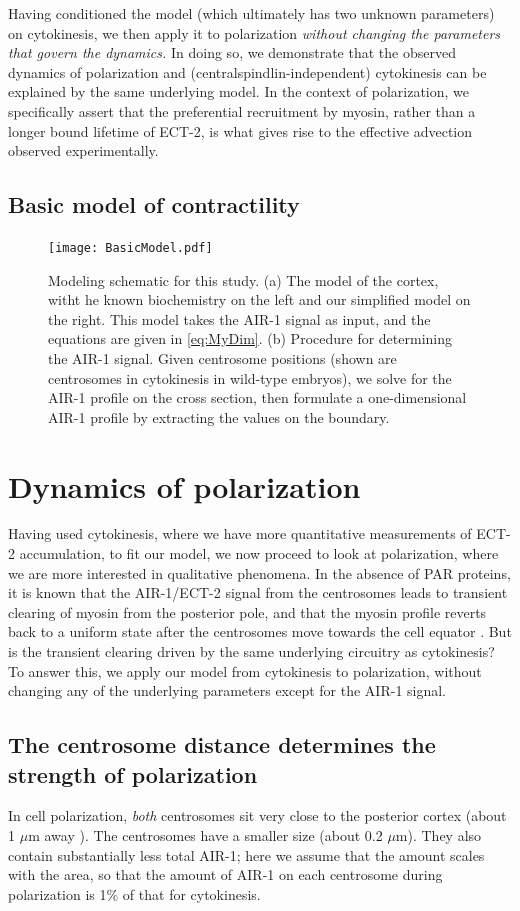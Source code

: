 \documentclass[11pt]{article}
\begin{document}
Having conditioned the model (which ultimately has two unknown parameters) on cytokinesis, we then apply it to polarization \emph{without changing the parameters that govern the dynamics.} In doing so, we demonstrate that the observed dynamics of polarization and (centralspindlin-independent) cytokinesis can be explained by the same underlying model. In the context of polarization, we specifically assert that the preferential recruitment by myosin, rather than a longer bound lifetime of ECT-2, is what gives rise to the effective advection observed experimentally. 

\subsection{Basic model of contractility}
\begin{figure}
\centering
\texttt{[image: BasicModel.pdf]}
\caption{\label{fig:ModelSch}Modeling schematic for this study. (a) The model of the cortex, witht he known biochemistry on the left and our simplified model on the right. This model takes the AIR-1 signal as input, and the equations are given in \eqref{eq:MyDim}. (b) Procedure for determining the AIR-1 signal. Given centrosome positions (shown are centrosomes in cytokinesis in wild-type embryos), we solve for the AIR-1 profile on the cross section, then formulate a one-dimensional AIR-1 profile by extracting the values on the boundary.}
\end{figure}


\section{Dynamics of polarization}
Having used cytokinesis, where we have more quantitative measurements of ECT-2 accumulation, to fit our model, we now proceed to look at polarization, where we are more interested in qualitative phenomena. In the absence of PAR proteins, it is known that the AIR-1/ECT-2 signal from the centrosomes leads to transient clearing of myosin from the posterior pole, and that the myosin profile reverts back to a uniform state after the centrosomes move towards the cell equator \citep[Fig.~2E]{gross2019guiding}. But is the transient clearing driven by the same underlying circuitry as cytokinesis? To answer this, we apply our model from cytokinesis to polarization, without changing any of the underlying parameters except for the AIR-1 signal.

\subsection{The centrosome distance determines the strength of polarization \label{sec:airpol}}
In cell polarization, \emph{both} centrosomes sit very close to the posterior cortex (about 1 $\mu$m away \citep{cowan2004centrosomes}). The centrosomes have a smaller size (about 0.2 $\mu$m). They also contain substantially less total AIR-1; here we assume that the amount scales with the area, so that the amount of AIR-1 on each centrosome during polarization is 1\% of that for cytokinesis. 
\end{document}
